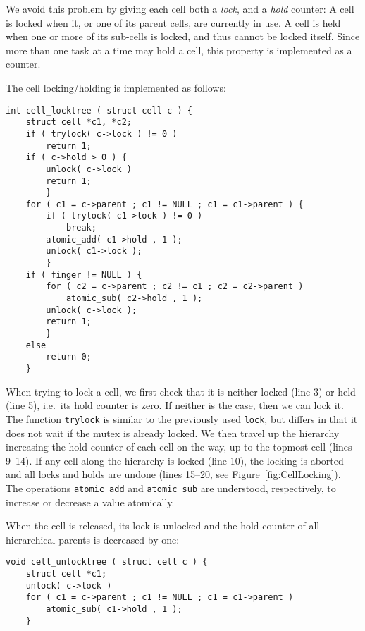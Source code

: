 \documentclass[final]{siamltex}
\newcommand{\fig}[1]
    {Figure~\ref{fig:#1}}
\begin{document}
We avoid this problem by giving each cell both a {\em lock},
and a {\em hold} counter:
A cell is locked when it, or one of its parent cells, are currently
in use. A cell is held when one or more of its sub-cells is locked,
and thus cannot be locked itself.
Since more than one task at a time may hold a cell, this property
is implemented as a counter.

The cell locking/holding is implemented as follows:
        
\begin{center}\begin{minipage}{0.8\textwidth}
    \begin{lstlisting}
int cell_locktree ( struct cell c ) {
    struct cell *c1, *c2;
    if ( trylock( c->lock ) != 0 )
        return 1;
    if ( c->hold > 0 ) {
        unlock( c->lock )
        return 1;
        }
    for ( c1 = c->parent ; c1 != NULL ; c1 = c1->parent ) {
        if ( trylock( c1->lock ) != 0 )
            break;
        atomic_add( c1->hold , 1 );
        unlock( c1->lock );
        }
    if ( finger != NULL ) {
        for ( c2 = c->parent ; c2 != c1 ; c2 = c2->parent )
            atomic_sub( c2->hold , 1 );
        unlock( c->lock );
        return 1;
        }
    else
        return 0;
    }
    \end{lstlisting}
\end{minipage}\end{center}

\noindent When trying to lock a cell, we first check that it is neither
locked (line 3) or held (line 5), i.e.~its hold counter is zero.
If neither is the case, then we can lock it.
The function {\tt trylock} is similar to the previously used {\tt lock},
but differs in that it does not wait if the mutex is already locked.
We then travel up the hierarchy increasing the 
hold counter of each cell on the way, up to the topmost cell (lines 9--14).
If any cell along the hierarchy is locked (line 10), the locking is aborted
and all locks and holds are undone (lines 15--20, see \fig{CellLocking}).
The operations {\tt atomic\_add} and {\tt atomic\_sub} are understood,
respectively, to increase or decrease a value atomically.

When the cell is released, its lock is unlocked and the hold
counter of all hierarchical parents is decreased by one:

\begin{center}\begin{minipage}{0.8\textwidth}
    \begin{lstlisting}
void cell_unlocktree ( struct cell c ) {
    struct cell *c1;
    unlock( c->lock )
    for ( c1 = c->parent ; c1 != NULL ; c1 = c1->parent )
        atomic_sub( c1->hold , 1 );
    }
    \end{lstlisting}
\end{minipage}\end{center}
\end{document}
